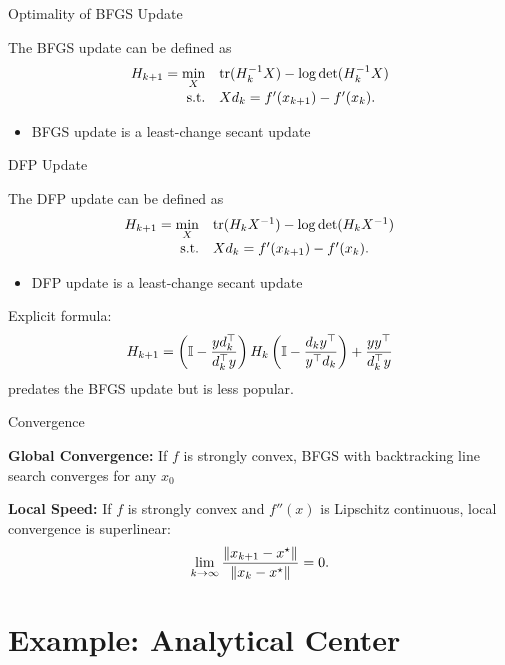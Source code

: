 \documentclass[9pt]{beamer}
\begin{document}
\begin{frame}{Optimality of BFGS Update}

  The BFGS update can be defined as
  \[
    \begin{array}{rl}
      H_{k+1} = {\displaystyle \min_X} & \operatorname{tr} ( H_k^{-1} X ) - \log \det ( H_k^{-1} X ) \\[0.5em]
      \mathrm{s.t.} & X d_k = f'(x_{k+1})-f'(x_k).
    \end{array}
  \]
  \begin{itemize}
  \item BFGS update is a least-change secant update
  \end{itemize}

\end{frame}

\begin{frame}{DFP Update}

  The DFP update can be defined as
  \[
    \begin{array}{rl}
      H_{k+1} = {\displaystyle \min_X} & \operatorname{tr} ( H_k X ^{-1} ) - \log \det ( H_k X ^{-1} ) \\[0.5em]
      \mathrm{s.t.} & X d_k = f'(x_{k+1})-f'(x_k).
    \end{array}
  \]
  \begin{itemize}
  \item DFP update is a least-change secant update
  \end{itemize}

  \vfill
  
  Explicit formula:
  \[
    H_{k+1} = \left(\mathbb I - \frac{yd_k^\top}{d_k^\top y}\right) H_k \left(\mathbb I - \frac{d_ky^\top}{y^\top d_k}\right) + \frac{y y^\top}{d_k^\top y } 
  \]
  predates the BFGS update but is less popular.
  
\end{frame}

\begin{frame}{Convergence}

  \textbf{Global Convergence:}
  If $f$ is strongly convex, BFGS with backtracking line search converges for any $x_0$

  \vfill

  \textbf{Local Speed:}
  If $f$ is strongly convex and $f''(x)$ is Lipschitz continuous, local convergence is superlinear:
  \[
      \lim_{k\to \infty} \frac{\left\|x_{k+1}-x^\star\right\|}{\left\|x_{k}-x^\star\right\|} = 0.
  \]
\end{frame}

\section{Example: Analytical Center}
\end{document}
